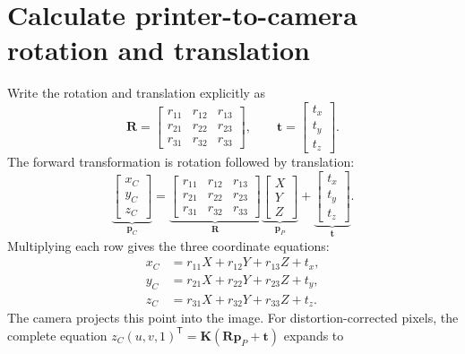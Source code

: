\documentclass[11pt,letterpaper]{article}
\newcommand{\p}{\mathbf p}
\newcommand{\R}{\mathbf R}
\newcommand{\tr}{\mathbf t}
\newcommand{\K}{\mathbf K}
\newcommand{\tp}{\mathsf T}
\begin{document}
\section{Calculate printer-to-camera rotation and translation}
Write the rotation and translation explicitly as
\begin{equation}
 \R=\begin{bmatrix}
 r_{11}&r_{12}&r_{13}\\
 r_{21}&r_{22}&r_{23}\\
 r_{31}&r_{32}&r_{33}
 \end{bmatrix},
 \qquad
 \tr=\begin{bmatrix}t_x\\t_y\\t_z\end{bmatrix}.
\end{equation}
The forward transformation is rotation followed by translation:
\begin{equation}
 \underbrace{\begin{bmatrix}x_C\\y_C\\z_C\end{bmatrix}}_{\p_C}
 =
 \underbrace{\begin{bmatrix}
 r_{11}&r_{12}&r_{13}\\
 r_{21}&r_{22}&r_{23}\\
 r_{31}&r_{32}&r_{33}
 \end{bmatrix}}_{\R}
 \underbrace{\begin{bmatrix}X\\Y\\Z\end{bmatrix}}_{\p_P}
 +\underbrace{\begin{bmatrix}t_x\\t_y\\t_z\end{bmatrix}}_{\tr}.
 \label{eq:forward}
\end{equation}
Multiplying each row gives the three coordinate equations:
\begin{equation}
 \begin{aligned}
 x_C&=r_{11}X+r_{12}Y+r_{13}Z+t_x,\\
 y_C&=r_{21}X+r_{22}Y+r_{23}Z+t_y,\\
 z_C&=r_{31}X+r_{32}Y+r_{33}Z+t_z.
 \end{aligned}
 \label{eq:forward-components}
\end{equation}
The camera projects this point into the image. For distortion-corrected
pixels, the complete equation $z_C(u,v,1)^\tp=\K(\R\p_P+\tr)$ expands to
\end{document}
